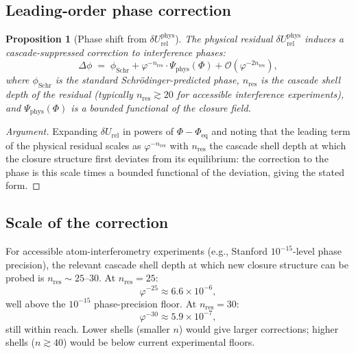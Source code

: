 \documentclass[12pt]{article}
\newtheorem{proposition}[theorem]{Proposition}
\theoremstyle{definition}
\theoremstyle{remark}
\newcommand{\dUrel}{\delta U_{\mathrm{rel}}}
\begin{document}
\subsection{Leading-order phase correction}

\begin{proposition}[Phase shift from $\dUrel^{\mathrm{phys}}$]\label{prop:phase}
The physical residual $\dUrel^{\mathrm{phys}}$ induces a cascade-suppressed correction to interference phases:
\begin{equation}
\Delta \phi \;=\; \phi_{\mathrm{Schr}} + \varphi^{-n_{\mathrm{res}}} \cdot \Psi_{\mathrm{phys}}(\Phi) + \mathcal{O}(\varphi^{-2 n_{\mathrm{res}}}),
\end{equation}
where $\phi_{\mathrm{Schr}}$ is the standard Schr\"odinger-predicted phase, $n_{\mathrm{res}}$ is the cascade shell depth of the residual (typically $n_{\mathrm{res}} \gtrsim 20$ for accessible interference experiments), and $\Psi_{\mathrm{phys}}(\Phi)$ is a bounded functional of the closure field.
\end{proposition}

\begin{proof}[Argument]
Expanding $\dUrel$ in powers of $\Phi - \Phi_{\mathrm{eq}}$ and noting that the leading term of the physical residual scales as $\varphi^{-n_{\mathrm{res}}}$ with $n_{\mathrm{res}}$ the cascade shell depth at which the closure structure first deviates from its equilibrium: the correction to the phase is this scale times a bounded functional of the deviation, giving the stated form.
\end{proof}

\subsection{Scale of the correction}

For accessible atom-interferometry experiments (e.g., Stanford $10^{-15}$-level phase precision), the relevant cascade shell depth at which new closure structure can be probed is $n_{\mathrm{res}} \sim 25$--$30$. At $n_{\mathrm{res}} = 25$:
\begin{equation}
\varphi^{-25} \approx 6.6 \times 10^{-6},
\end{equation}
well above the $10^{-15}$ phase-precision floor. At $n_{\mathrm{res}} = 30$:
\begin{equation}
\varphi^{-30} \approx 5.9 \times 10^{-7},
\end{equation}
still within reach. Lower shells (smaller $n$) would give larger corrections; higher shells ($n \gtrsim 40$) would be below current experimental floors.
\end{document}
